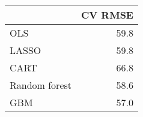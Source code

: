 
\begin{tabular}{lr}
\toprule
  & CV RMSE\\
\midrule
OLS & 59.8\\
LASSO & 59.8\\
CART & 66.8\\
Random forest & 58.6\\
GBM & 57.0\\
\bottomrule
\end{tabular}